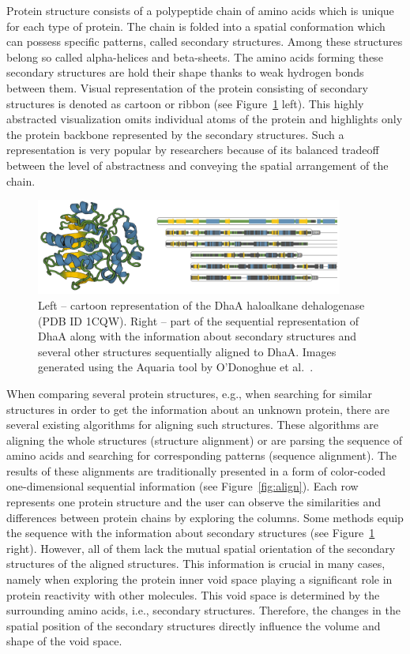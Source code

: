 \documentclass[twocolumn]{bmcart}%
\begin{document}
Protein structure consists of a polypeptide chain of amino acids which is unique for each type of protein. 
The chain is folded into a spatial conformation which can possess specific patterns, called secondary structures.
Among these structures belong so called alpha-helices and beta-sheets. 
The amino acids forming these secondary structures are hold their shape thanks to weak hydrogen bonds between them.
Visual representation of the protein consisting of secondary structures is denoted as cartoon or ribbon (see Figure~\ref{fig:aquaria} left).
This highly abstracted visualization omits individual atoms of the protein and highlights only the protein backbone represented by the secondary structures.
Such a representation is very popular by researchers because of its balanced tradeoff between the level of abstractness and conveying the spatial arrangement of the chain.

\begin{figure}[th]
  \centering
  \includegraphics[width=0.9\textwidth]{pics/aquaria.png}
  \caption{Left -- cartoon representation of the DhaA haloalkane dehalogenase (PDB ID 1CQW). Right -- part of the sequential representation of DhaA along with the information about secondary structures and several other structures sequentially aligned to DhaA. Images generated using the Aquaria tool by O'Donoghue et al.~\cite{odonoghue2015}.}
  \label{fig:aquaria}
\end{figure}

When comparing several protein structures, e.g., when searching for similar structures in order to get the information about an unknown protein, there are several existing algorithms for aligning such structures.
These algorithms are aligning the whole structures (structure alignment) or are parsing the sequence of amino acids and searching for corresponding patterns (sequence alignment). 
The results of these alignments are traditionally presented in a form of color-coded one-dimensional sequential information (see Figure~\ref{fig:align}).
Each row represents one protein structure and the user can observe the similarities and differences between protein chains by exploring the columns.
Some methods equip the sequence with the information about secondary structures (see Figure~\ref{fig:aquaria} right).
However, all of them lack the mutual spatial orientation of the secondary structures of the aligned structures.
This information is crucial in many cases, namely when exploring the protein inner void space playing a significant role in protein reactivity with other molecules.
This void space is determined by the surrounding amino acids, i.e., secondary structures. 
Therefore, the changes in the spatial position of the secondary structures directly influence the volume and shape of the void space.
\end{document}
